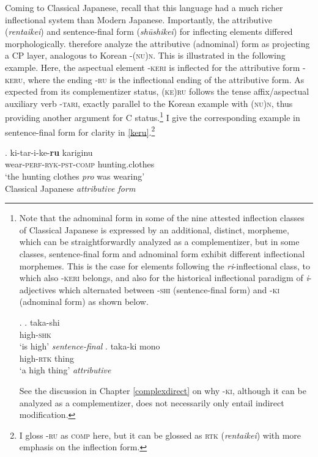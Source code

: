 \documentclass [output=book,colorlinks,citecolor=brown]{langscibook}
\begin{document}
Coming to Classical Japanese, recall that this language had a much richer inflectional system than Modern Japanese. Importantly, the attributive (\textit{rentaikei}) and sentence-final form (\textit{shūshikei}) for inflecting elements differed morphologically. \citet[31–33]{kaplan:1995:the} therefore analyze the attributive (adnominal) form as projecting a CP layer, analogous to Korean -\textsc{(nu)n}. This is illustrated in the following example. Here, the aspectual element -\textsc{keri} is inflected for the attributive form -\textsc{keru}, where the ending -\textsc{ru} is the inflectional ending of the attributive form. As expected from its complementizer status, \textsc{(ke)ru} follows the tense affix/aspectual auxiliary verb -\textsc{tari}, exactly parallel to the Korean example with \textsc{(nu)n}, thus providing another argument for C status.\footnote{Note that the adnominal form in some of the nine attested inflection classes of Classical Japanese is expressed by an additional, distinct, morpheme, which can be straightforwardly analyzed as a complementizer, but in some classes, sentence-final form and adnominal form exhibit different inflectional morphemes. This is the case for elements following the \textit{ri}-inflectional class, to which also -\textsc{keri} belongs, and also for the historical inflectional paradigm of \textit{i}-adjectives which alternated between -\textsc{shi} (sentence-final form) and -\textsc{ki} (adnominal form) as shown below.

\par

\ex. \ag. taka-shi\\
high-\textsc{shk}\\
`is high' \null \hfill \textit{sentence-final}
\bg. taka-ki mono\\
high-\textsc{rtk} thing\\
`a high thing' \null \hfill \textit{attributive}

\par


See the discussion in Chapter \ref{complexdirect} on why -\textsc{ki}, although it can be analyzed as a complementizer, does not necessarily only entail indirect modification.} I give the corresponding example in sentence-final form for clarity in \ref{keru}.\footnote{I gloss -\textsc{ru} as \textsc{comp} here, but it can be glossed as \textsc{rtk} (\textit{rentaikei}) with more emphasis on the inflection form.} %

\exg. ki-tar-i-ke-\textbf{ru} kariginu\\
wear-\textsc{perf-ryk-pst-comp} hunting.clothes\\
`the hunting clothes \textit{pro} was wearing' \\ \null \hfill Classical Japanese \textit{attributive form} \citep[32]{kaplan:1995:the}
\end{document}
